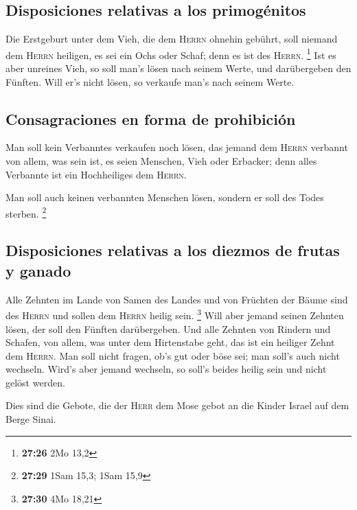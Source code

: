 \hypertarget{disposiciones-relativas-a-los-primoguxe9nitos}{%
\subsection{Disposiciones relativas a los
primogénitos}\label{disposiciones-relativas-a-los-primoguxe9nitos}}

 Die Erstgeburt unter dem Vieh, die dem \textsc{Herrn}
ohnehin gebührt, soll niemand dem \textsc{Herrn} heiligen, es sei ein
Ochs oder Schaf; denn es ist des \textsc{Herrn}. \footnote{\textbf{27:26}
  2Mo 13,2}  Ist es aber unreines Vieh, so soll man's
lösen nach seinem Werte, und darübergeben den Fünften. Will er's nicht
lösen, so verkaufe man's nach seinem Werte.

\hypertarget{consagraciones-en-forma-de-prohibiciuxf3n}{%
\subsection{Consagraciones en forma de
prohibición}\label{consagraciones-en-forma-de-prohibiciuxf3n}}

 Man soll kein Verbanntes verkaufen noch lösen, das
jemand dem \textsc{Herrn} verbannt von allem, was sein ist, es seien
Menschen, Vieh oder Erbacker; denn alles Verbannte ist ein Hochheiliges
dem \textsc{Herrn}.

 Man soll auch keinen verbannten Menschen lösen, sondern
er soll des Todes sterben. \footnote{\textbf{27:29} 1Sam 15,3; 1Sam 15,9}

\hypertarget{disposiciones-relativas-a-los-diezmos-de-frutas-y-ganado}{%
\subsection{Disposiciones relativas a los diezmos de frutas y
ganado}\label{disposiciones-relativas-a-los-diezmos-de-frutas-y-ganado}}

 Alle Zehnten im Lande von Samen des Landes und von
Früchten der Bäume sind des \textsc{Herrn} und sollen dem \textsc{Herrn}
heilig sein. \footnote{\textbf{27:30} 4Mo 18,21}  Will
aber jemand seinen Zehnten lösen, der soll den Fünften darübergeben.
 Und alle Zehnten von Rindern und Schafen, von allem, was
unter dem Hirtenstabe geht, das ist ein heiliger Zehnt dem
\textsc{Herrn}.  Man soll nicht fragen, ob's gut oder
böse sei; man soll's auch nicht wechseln. Wird's aber jemand wechseln,
so soll's beides heilig sein und nicht gelöst werden.

 Dies sind die Gebote, die der \textsc{Herr} dem Mose
gebot an die Kinder Israel auf dem Berge Sinai.

